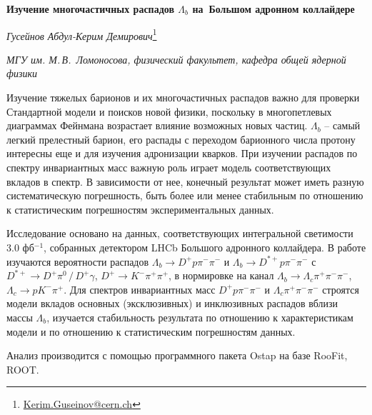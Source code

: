 \documentclass[a4paper, 12pt]{article}
\def\mailto#1{\href{mailto:#1}{#1}}
\def\Lb{\varLambda_b}
\begin{document}
\begin{center}
{\bf Изучение многочастичных распадов $\Lb$ на~Большом адронном коллайдере }

\textit{Гусейнов Абдул-Керим Демирович}\footnote{\mailto{Kerim.Guseinov@cern.ch}}

\textit{МГУ им. М.\,В.~Ломоносова, физический факультет, кафедра общей ядерной физики}
\end{center}

Изучение тяжелых барионов и их многочастичных распадов важно для проверки Стандартной модели и поисков новой физики, поскольку в многопетлевых диаграммах Фейнмана возрастает влияние возможных новых частиц. 
$\Lb$ -- самый легкий прелестный барион, его распады с переходом барионного числа протону интересны еще и для изучения адронизации кварков. 
При изучении распадов по спектру инвариантных масс важную роль играет модель соответствующих вкладов в спектр. 
В зависимости от нее, конечный результат может иметь разную систематическую погрешность, быть более или менее стабильным по отношению к статистическим погрешностям экспериментальных данных. 

Исследование основано на данных, соответствующих интегральной светимости $3.0$ фб$^{-1}$, собранных детектором LHCb Большого адронного коллайдера. В работе изучаются вероятности распадов $\Lb\to D^{+}p\pi^-\pi^-$ и $\Lb\to D^{*+}p\pi^-\pi^-$ с $D^{*+}\to D^+\pi^0\,\big/\,D^+\gamma$, $D^{+}\to K^-\pi^+\pi^+$, в нормировке на канал $\Lb\to\varLambda_c\pi^+\pi^-\pi^-$, $\varLambda_c\to pK^-\pi^+$. 
Для спектров инвариантных масс $D^+p\pi^-\pi^-$ и $\varLambda_c\pi^+\pi^-\pi^-$ строятся модели вкладов основных (эксклюзивных) и инклюзивных распадов вблизи массы $\Lb$, изучается стабильность результата по отношению к характеристикам модели и по отношению к статистическим погрешностям данных. 

Анализ производится с помощью программного пакета Ostap на базе RooFit, ROOT. 
\end{document}
